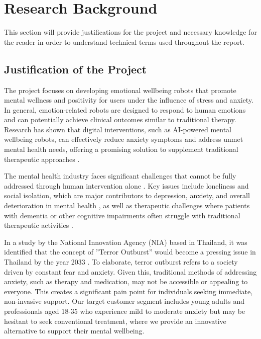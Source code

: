 \section{Research Background}
This section will provide justifications for the project and necessary knowledge for the reader in order to
understand technical terms used throughout the report.

\subsection{Justification of the Project}

The project focuses on developing emotional wellbeing robots that promote mental wellness and positivity for users under the influence of stress and anxiety. In general, emotion-related robots are designed to respond to human emotions and can potentially achieve clinical outcomes similar to traditional therapy\cite{Palmer2024.07.17.24310551}. Research has shown that digital interventions, such as AI-powered mental wellbeing robots, can effectively reduce anxiety symptoms and address unmet mental health needs, offering a promising solution to supplement traditional therapeutic approaches \cite{jarvis2024companion}.

The mental health industry faces significant challenges that cannot be fully addressed through human
intervention alone \cite{charles-2024}. Key issues include loneliness and social isolation, which are major contributors
to depression, anxiety, and overall deterioration in mental health \cite{GOH202372}, as well as therapeutic challenges
where patients with dementia or other cognitive impairments often struggle with traditional therapeutic
activities \cite{Sukhawathanakul_Crizzle_Tuokko_Naglie_Rapoport_2021}.

In a study by the National Innovation Agency (NIA) based in Thailand, it was identified that the
concept of ”Terror Outburst” would become a pressing issue in Thailand by the year 2033 \cite{nia2023}. To
elaborate, terror outburst refers to a society driven by constant fear and anxiety. Given this, traditional
methods of addressing anxiety, such as therapy and medication, may not be accessible or appealing to
everyone. This creates a significant pain point for individuals seeking immediate, non-invasive support.
Our target customer segment includes young adults and professionals aged 18-35 who experience mild to
moderate anxiety but may be hesitant to seek conventional treatment, where we provide an innovative
alternative to support their mental wellbeing.

